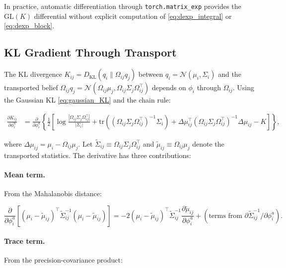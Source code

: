 \documentclass[twoside,11pt]{article}
\begin{document}
In practice, automatic differentiation through \texttt{torch.matrix\_exp} provides the $\mathrm{GL}(K)$ differential without explicit computation of \eqref{eq:dexp_integral} or \eqref{eq:dexp_block}.

\subsection{KL Gradient Through Transport}

The KL divergence $K_{ij} = D_{\mathrm{KL}}(q_i \| \Omega_{ij} q_j)$ between $q_i = \mathcal{N}(\mu_i, \Sigma_i)$ and the transported belief $\Omega_{ij} q_j = \mathcal{N}(\Omega_{ij}\mu_j, \Omega_{ij}\Sigma_j\Omega_{ij}^\top)$ depends on $\phi_i$ through $\Omega_{ij}$. Using the Gaussian KL \eqref{eq:gaussian_KL} and the chain rule:

\begin{align}
\frac{\partial K_{ij}}{\partial \phi_i^a}
&= \frac{\partial}{\partial \phi_i^a}\left\{
\frac{1}{2}\left[
\log\frac{|\Omega_{ij}\Sigma_j\Omega_{ij}^\top|}{|\Sigma_i|}
+ \mathrm{tr}\!\left((\Omega_{ij}\Sigma_j\Omega_{ij}^\top)^{-1}\Sigma_i\right)
+ \Delta\mu_{ij}^\top (\Omega_{ij}\Sigma_j\Omega_{ij}^\top)^{-1} \Delta\mu_{ij}
- K
\right]\right\},
\label{eq:dKL_dphi_expanded}
\end{align}

where $\Delta\mu_{ij} = \mu_i - \Omega_{ij}\mu_j$. Let $\tilde{\Sigma}_{ij} \equiv \Omega_{ij}\Sigma_j\Omega_{ij}^\top$ and $\tilde{\mu}_{ij} \equiv \Omega_{ij}\mu_j$ denote the transported statistics. The derivative has three contributions:

\paragraph{Mean term.} From the Mahalanobis distance:

\begin{equation}
\frac{\partial}{\partial \phi_i^a}\left[(\mu_i - \tilde{\mu}_{ij})^\top \tilde{\Sigma}_{ij}^{-1}(\mu_i - \tilde{\mu}_{ij})\right]
= -2(\mu_i - \tilde{\mu}_{ij})^\top \tilde{\Sigma}_{ij}^{-1} \frac{\partial \tilde{\mu}_{ij}}{\partial \phi_i^a}
+ (\text{terms from } \partial\tilde{\Sigma}_{ij}^{-1}/\partial\phi_i^a).
\label{eq:mean_term_phi}
\end{equation}

\paragraph{Trace term.} From the precision-covariance product:
\end{document}
